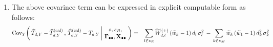 \begin{lemma}
\begin{enumerate}
\begin{eqnarray*}
            \begin{array}{c} s,s_{R}, \\ \Gdotdot,\Xobs \end{array}
            \right.
            \!\!\right)
    \\
    &&
        +\;
        E_{Y}\!\left[\;
            \widetilde{T}_{d,Y} - \widehat{T}^{\textnormal{(cal)}}_{d,Y}
            \left\vert\!
            \begin{array}{c} s,s_{R}, \\ \Gdotdot,\Xobs \end{array}
            \right.
            \!\!\right]
        \cdot
        {\color{red}
        E_{Y}\!\left[\;
            \widehat{T}^{\textnormal{(cal)}}_{d,Y} - T_{d,Y}
            \left\vert\!
            \begin{array}{c} s,s_{R}, \\ \Gdotdot,\Xobs \end{array}
            \right.
            \!\!\right]
        }
    \end{eqnarray*}
\item
    The above covarince term
    can be expressed in explicit computable form as follows:
    \begin{eqnarray*}
    \textnormal{Cov}_{Y}\!\left(\,
        \widetilde{T}_{d,Y} - \widehat{T}^{\textnormal{(cal)}}_{d,Y}
        \,,\,
        \widehat{T}^{\textnormal{(cal)}}_{d,Y} - T_{d,Y}
        \left\vert\!
        \begin{array}{c} s,s_{R}, \\ \mathbf{\Gamma}_{\bullet\bullet},\mathbf{X}_{\bullet\bullet} \end{array}
        \right.
        \!\!\right)
    & = &
        \underset{l \in s_{R}}{\sum}\,
            \widetilde{W}^{(+)}_{d,l}\,(\widetilde{w}_{k}-1)\,d_{l}\,\sigma_{l}^{2}
        \,-\,
        \underset{k \in s_{M}}{\sum}\,
            \widetilde{w}_{k}\,(\widetilde{w}_{1}-1)\,d_{k}^{2}\,\sigma_{k}^{2}
    \end{eqnarray*}

\end{enumerate}
\end{lemma}
